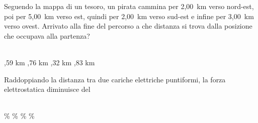 \documentclass[a4paper,11pt]{exam}
\begin{document}
\begin{questions}
    
\question Seguendo la mappa di un tesoro, un pirata cammina per 2,00~km verso nord-est, poi per 5,00~km verso est, quindi per 2,00~km verso sud-est e infine per 3,00~km verso ovest. Arrivato alla fine del percorso a che distanza si trova dalla posizione che occupava alla partenza?\\\
\begin{oneparchoices}
  ,59 km
  ,76 km
  ,32 km
  \choice 4,83 km
\end{oneparchoices}

    
\question Raddoppiando la distanza tra due cariche elettriche puntiformi, la forza elettrostatica diminuisce del\\\
\begin{oneparchoices}
  \choice 90\%
  \%
  \%
  \%
\end{oneparchoices}

    
\end{questions}

    
    \newpage
    
    
\end{document}
